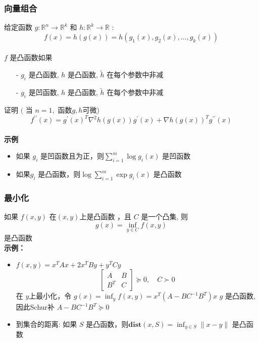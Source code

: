 \documentclass[handout,10pt]{beamer}
\begin{document}
\begin{frame}
	\frametitle{向量组合}
	给定函数 $g: \mathbb{R}^{n} \rightarrow \mathbb{R}^{k}$ 和 $h: \mathbb{R}^{k} \rightarrow \mathbb{R}$ :
	\begin{equation}
		f(x)=h(g(x))=h\left(g_{1}(x), g_{2}(x), \ldots, g_{k}(x)\right)
	\end{equation}\\
	$f$ 是凸函数如果
	\begin{itemize}
		\item[-] $g_{i}$ 是凸函数, $h$ 是凸函数, $\tilde{h}$ 在每个参数中非减
		\item[-] $g_{i}$ 是凹函数, $h$ 是凸函数, $\tilde{h}$ 在每个参数中非减

	\end{itemize}
	\bigskip
    证明 $($ 当 $n=1,$ 函数$g, h$可微)
    \begin{equation}
    	f^{\prime \prime}(x)=g^{\prime}(x)^{T} \nabla^{2} h(g(x)) g^{\prime}(x)+\nabla h(g(x))^{T} g^{\prime \prime}(x)
    \end{equation}\\
    \bigskip
    \textbf{示例}\\
    \begin{itemize}
    	\item 如果 $g_{i}$ 是凹函数且为正，则$\sum_{i=1}^{m} \log g_{i}(x)$ 是凹函数
    	\item 如果$g_{i}$ 是凸函数，则$\log \sum_{i=1}^{m} \exp g_{i}(x)$ 是凸函数
    \end{itemize}
\end{frame}
\begin{frame}
	\frametitle{最小化}
	如果 $f(x, y)$ 在$(x, y)$上是凸函数  ，且 $C$ 是一个凸集, 则
	\begin{equation}
		g(x)=\inf _{y \in C} f(x, y)
	\end{equation}
	是凸函数\\
	\bigskip
	\textbf{示例：}
	\begin{itemize}
		\item $f(x, y)=x^{T} A x+2 x^{T} B y+y^{T} C y$ 
		\begin{equation}
			\left[\begin{array}{cc}
            A & B \\
            B^{T} & C
        \end{array}\right] \succeq 0, \quad C \succ 0
		\end{equation}
		在 $y$上最小化，令 $g(x)=\inf _{y} f(x, y)=x^{T}\left(A-B C^{-1} B^{T}\right) x$
        $g$ 是凸函数, 因此Schur补 $A-B C^{-1} B^{T} \succeq 0$
		\item 到集合的距离: 如果 $S$ 是凸函数，则$\textbf{dist}(x, S)=\inf _{y \in S}\|x-y\|$ 是凸函数
	\end{itemize}
\end{frame}
\end{document}

